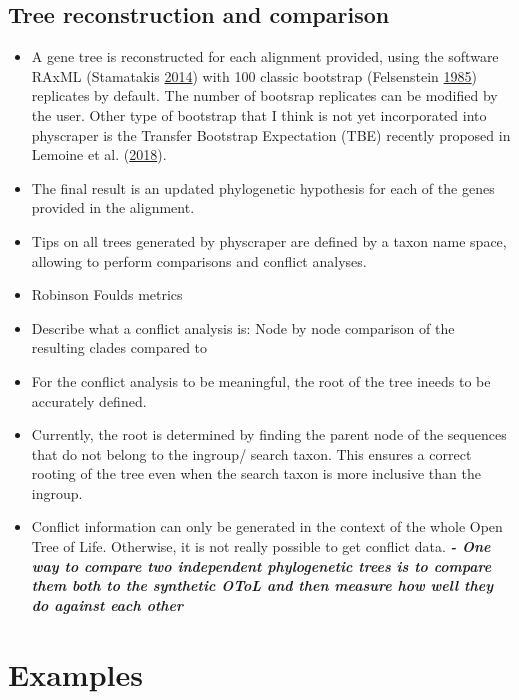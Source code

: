 \documentclass[]{article}
\providecommand{\tightlist}{%
  \setlength{\itemsep}{0pt}\setlength{\parskip}{0pt}}
\begin{document}
\hypertarget{tree-reconstruction-and-comparison}{%
\subsection{Tree reconstruction and comparison}\label{tree-reconstruction-and-comparison}}

\begin{itemize}
\tightlist
\item
  A gene tree is reconstructed for each alignment provided, using the software RAxML (Stamatakis \protect\hyperlink{ref-stamatakis2014raxml}{2014})
  with 100 classic bootstrap (Felsenstein \protect\hyperlink{ref-felsenstein1985confidence}{1985}) replicates by default. The number of bootsrap replicates can be modified by the user.
  Other type of bootstrap that I think is not yet incorporated into physcraper is the Transfer Bootstrap Expectation (TBE) recently proposed in Lemoine et al. (\protect\hyperlink{ref-lemoine2018renewing}{2018}).
\item
  The final result is an updated phylogenetic hypothesis for each of the genes provided in the alignment.
\item
  Tips on all trees generated by physcraper are defined by a taxon name space, allowing to perform comparisons and conflict analyses.
\item
  Robinson Foulds metrics
\item
  Describe what a conflict analysis is: Node by node comparison of the resulting clades compared to
\item
  For the conflict analysis to be meaningful, the root of the tree ineeds to be accurately defined.
\item
  Currently, the root is determined by finding the parent node of the sequences that do not belong to the ingroup/ search taxon. This ensures a correct rooting of the tree even when the search taxon is more inclusive than the ingroup.
\item
  Conflict information can only be generated in the context of the whole Open Tree of
  Life. Otherwise, it is not really possible to get conflict data.
  \textbf{\emph{- One way to compare two independent phylogenetic trees is to compare them both to
  the synthetic OToL and then measure how well they do against each other}}
\end{itemize}

\hypertarget{examples}{%
\section{Examples}\label{examples}}
\end{document}

